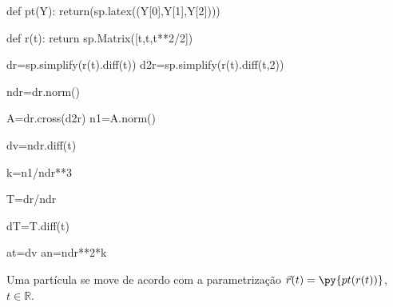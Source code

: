 \documentclass[a4paper,addpoints,12pt]{exam}
\newcommand{\R}{\mathbb{R}}
\newcommand{\pyl}[1]{\py{sp.latex(#1)}}
\begin{document}
\begin{questions}
\begin{pycode}
def pt(Y):
 return(sp.latex((Y[0],Y[1],Y[2])))
 
def r(t):
	return sp.Matrix([t,t,t**2/2])

dr=sp.simplify(r(t).diff(t))
d2r=sp.simplify(r(t).diff(t,2))

ndr=dr.norm()

A=dr.cross(d2r)
n1=A.norm()

dv=ndr.diff(t)

k=n1/ndr**3

T=dr/ndr

dT=T.diff(t)

at=dv
an=ndr**2*k


\end{pycode}

\question[3] Uma partícula se move de acordo com a parametrização $\vec{r}(t)=\py{pt(r(t))}$, $t\in \R$.

\begin{solution}
\noindent 




\end{solution}
\end{questions}
\end{document}
